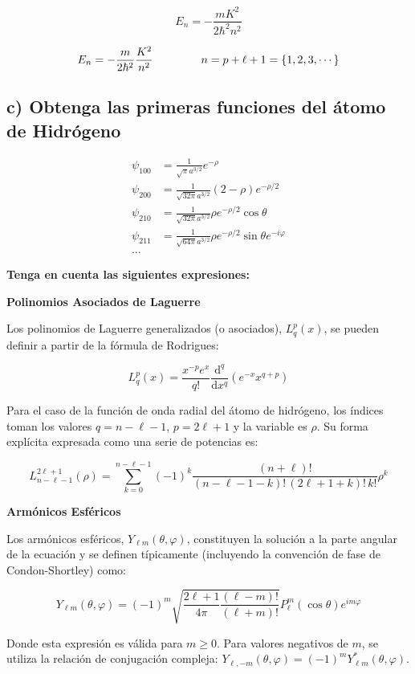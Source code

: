\documentclass[a4paper]{article}
\begin{document}
$$E_n = -\frac{mK^2}{2\hbar^2 n^2}$$

$$E_n = -\frac{m}{2\hbar^2}\frac{K^2}{n^2} \hspace{1.5cm} n = p + \ell + 1 = \{1, 2, 3, \cdots \}$$

\subsection{c) Obtenga las primeras funciones del átomo de Hidrógeno}

$$\begin{aligned}
\psi_{100} &= \frac{1}{\sqrt{\pi}a^{3/2}}e^{-\rho} \\
\psi_{200} &= \frac{1}{\sqrt{32\pi}a^{3/2}}(2-\rho)e^{-\rho/2} \\
\psi_{210} &= \frac{1}{\sqrt{32\pi}a^{3/2}}\rho e^{-\rho/2}\cos\theta \\
\psi_{211} &= \frac{1}{\sqrt{64\pi}a^{3/2}}\rho e^{-\rho/2}\sin\theta e^{-i\varphi} \\
\dots 
\end{aligned}$$

\textbf{Tenga en cuenta las siguientes expresiones:}

\textbf{Polinomios Asociados de Laguerre}

Los polinomios de Laguerre generalizados (o asociados), $L_q^p(x)$, se pueden definir a partir de la fórmula de Rodrigues:

$$L_q^p(x) = \frac{x^{-p} e^x}{q!} \frac{\mathrm{d}^q}{\mathrm{d}x^q} \left( e^{-x} x^{q+p} \right)$$

Para el caso de la función de onda radial del átomo de hidrógeno, los índices toman los valores $q = n-\ell-1$, $p = 2\ell+1$ y la variable es $\rho$. Su forma explícita expresada como una serie de potencias es:

$$L_{n-\ell-1}^{2\ell+1}(\rho) = \sum_{k=0}^{n-\ell-1} (-1)^k \frac{(n+\ell)!}{(n-\ell-1-k)! \, (2\ell+1+k)! \, k!} \rho^k$$


\textbf{Armónicos Esféricos}

Los armónicos esféricos, $Y_{\ell m}(\theta, \varphi)$, constituyen la solución a la parte angular de la ecuación y se definen típicamente (incluyendo la convención de fase de Condon-Shortley) como:

$$Y_{\ell m}(\theta, \varphi) = (-1)^m \sqrt{\frac{2\ell+1}{4\pi} \frac{(\ell-m)!}{(\ell+m)!}} P_\ell^m(\cos\theta) e^{im\varphi}$$

Donde esta expresión es válida para $m \geq 0$. Para valores negativos de $m$, se utiliza la relación de conjugación compleja: $Y_{\ell, -m}(\theta, \varphi) = (-1)^m Y_{\ell m}^*(\theta, \varphi)$.
\end{document}

